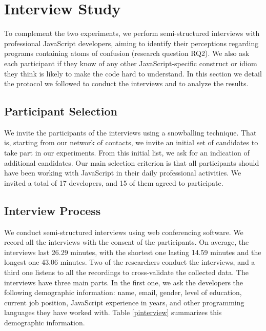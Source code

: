\section{Interview Study}\label{sec:method:interview}

To complement the two experiments, we perform semi-structured interviews with professional JavaScript developers, aiming to identify their perceptions regarding programs containing atoms of confusion (research question RQ2). We also ask each participant if they know of any other JavaScript-specific construct or idiom they think is likely to make the code hard to understand. %
In this section we detail the protocol we followed to conduct the interviews and to analyze the results.


\subsection{Participant Selection} We invite the participants of the interviews using a snowballing technique. That is, starting from our network of contacts, we invite an initial set of candidates to take part in our experiments. From this initial list, we ask for an indication of additional candidates. Our main selection criterion is that all participants should have been working with JavaScript in their daily professional activities. We invited a total of 17 developers, and 15 of them agreed to participate.   


\subsection{Interview Process} We conduct semi-structured interviews using web conferencing software. We record all the interviews with the consent of the participants. On average, the interviews last 26.29 minutes, with the shortest one lasting 14.59 minutes and the longest one 43.06 minutes. Two of the researchers conduct the interviews, and a third one listens to all the recordings to cross-validate the collected data. The interviews have three main parts. In the first one, we ask the developers the following demographic information: name, email, gender, level of education, current job position, JavaScript experience in years, and other programming languages they have worked with. Table \ref{pinterview} summarizes this demographic information.

